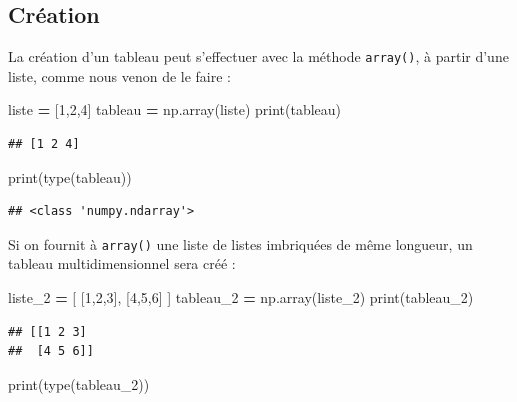 \documentclass[12pt,]{book}
\newenvironment{Shaded}{\begin{snugshade}}{\end{snugshade}}
\newcommand{\DecValTok}[1]{\textcolor[rgb]{0.00,0.00,0.81}{#1}}
\newcommand{\OperatorTok}[1]{\textcolor[rgb]{0.81,0.36,0.00}{\textbf{#1}}}
\newcommand{\BuiltInTok}[1]{#1}
\newcommand{\NormalTok}[1]{#1}
\numberwithin{equation}{section}
\numberwithin{countremarque}{section}
\begin{document}
\subsection{Création}\label{creation}

La création d'un tableau peut s'effectuer avec la méthode
\texttt{array()}, à partir d'une liste, comme nous venon de le faire :

\begin{Shaded}
\begin{Highlighting}[]
\NormalTok{liste }\OperatorTok{=}\NormalTok{ [}\DecValTok{1}\NormalTok{,}\DecValTok{2}\NormalTok{,}\DecValTok{4}\NormalTok{]}
\NormalTok{tableau }\OperatorTok{=}\NormalTok{ np.array(liste)}
\BuiltInTok{print}\NormalTok{(tableau)}
\end{Highlighting}
\end{Shaded}

\begin{lstlisting}
## [1 2 4]
\end{lstlisting}

\begin{Shaded}
\begin{Highlighting}[]
\BuiltInTok{print}\NormalTok{(}\BuiltInTok{type}\NormalTok{(tableau))}
\end{Highlighting}
\end{Shaded}

\begin{lstlisting}
## <class 'numpy.ndarray'>
\end{lstlisting}

Si on fournit à \texttt{array()} une liste de listes imbriquées de même
longueur, un tableau multidimensionnel sera créé :

\begin{Shaded}
\begin{Highlighting}[]
\NormalTok{liste_2 }\OperatorTok{=}\NormalTok{ [ [}\DecValTok{1}\NormalTok{,}\DecValTok{2}\NormalTok{,}\DecValTok{3}\NormalTok{], [}\DecValTok{4}\NormalTok{,}\DecValTok{5}\NormalTok{,}\DecValTok{6}\NormalTok{] ]}
\NormalTok{tableau_2 }\OperatorTok{=}\NormalTok{ np.array(liste_2)}
\BuiltInTok{print}\NormalTok{(tableau_2)}
\end{Highlighting}
\end{Shaded}

\begin{lstlisting}
## [[1 2 3]
##  [4 5 6]]
\end{lstlisting}

\begin{Shaded}
\begin{Highlighting}[]
\BuiltInTok{print}\NormalTok{(}\BuiltInTok{type}\NormalTok{(tableau_2))}
\end{Highlighting}
\end{Shaded}
\end{document}

